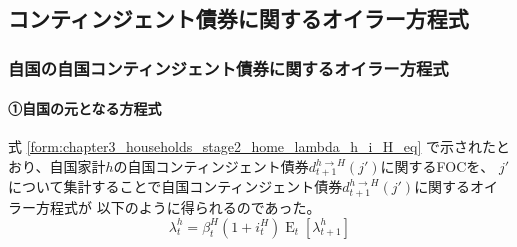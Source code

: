 
\subsection{コンティンジェント債券に関するオイラー方程式}
\label{sec:chapter3_representative_household_euler_contingent}

\subsubsection{自国の自国コンティンジェント債券に関するオイラー方程式}
\label{sec:chapter3_representative_household_euler_contingent_home}

\paragraph{①自国の元となる方程式}
\label{sec:chapter3_representative_household_euler_contingent_home_original}
式
\eqref{form:chapter3_households_stage2_home_lambda_h_i_H_eq}
で示されたとおり、自国家計\(h\)の自国コンティンジェント債券\(d_{t+1}^{h\to H}(j')\)に関するFOCを、
\(j'\)について集計することで自国コンティンジェント債券\(d_{t+1}^{h\to H}(j')\)に関するオイラー方程式が
以下のように得られるのであった。
\begin{equation}
\label{form:chapter3_representative_household_euler_contingent_home_original_lambda_h_i_H_eq}
    \lambda_t^h=\beta_t^H(1+i_t^H)\operatorname{E}_t[\lambda_{t+1}^h]
\end{equation}


